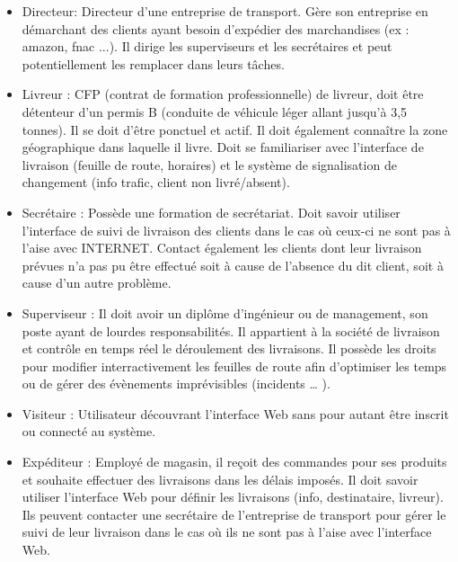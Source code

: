 \documentclass{report}
\begin{document}
\begin{itemize}

\item{Directeur:} Directeur d’une entreprise de transport. Gère son entreprise en démarchant des clients ayant besoin d’expédier des marchandises (ex : amazon, fnac ...). Il dirige les superviseurs et les secrétaires et peut potentiellement les remplacer dans leurs tâches.\\ 

\item{\hypertarget{labDPULiv}{Livreur} :} CFP (contrat de formation professionnelle) de livreur, doit être détenteur d’un permis B (conduite de véhicule léger allant jusqu’à 3,5 tonnes). Il se doit d’être ponctuel et actif. Il doit également connaître la zone géographique dans laquelle il livre.  Doit se familiariser avec l’interface de livraison (feuille de route, horaires) et le système de signalisation de changement (info trafic, client non livré/absent).\\

\item{\hypertarget{labDPUSec}{Secrétaire} :} Possède une formation de secrétariat. Doit savoir utiliser l’interface de suivi de livraison des clients dans le cas où ceux-ci ne sont pas à l’aise avec INTERNET. Contact également les clients dont leur livraison prévues n’a pas pu être effectué soit à cause de l’absence du dit client, soit à cause d’un autre problème.\\

\item{\hypertarget{labDPUSup}{Superviseur} :} Il doit avoir un diplôme d’ingénieur ou de management, son poste ayant de lourdes responsabilités. Il appartient à la société de livraison et contrôle en temps réel le déroulement des livraisons. Il possède les droits pour modifier interractivement les feuilles de route afin d’optimiser les temps ou de gérer des évènements imprévisibles (incidents … ).\\

\item{Visiteur :} Utilisateur découvrant l’interface Web sans pour autant être inscrit ou connecté au système.\\

\item{Expéditeur :} Employé de magasin, il reçoit des commandes pour ses produits et souhaite effectuer des livraisons dans les délais imposés. Il doit savoir utiliser l’interface Web pour définir les livraisons (info, destinataire, livreur). Ils peuvent contacter une secrétaire de l’entreprise de transport pour gérer le suivi de leur livraison dans le cas où ils ne sont pas à l’aise avec l’interface Web.\\


\end{itemize}
\end{document}
